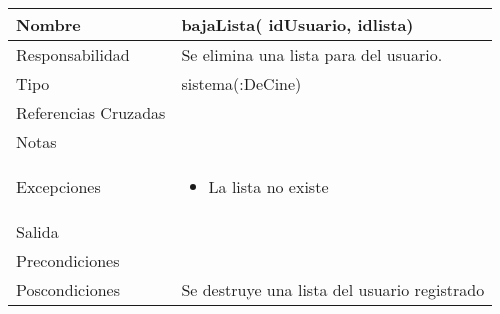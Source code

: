 \documentclass{article}
\begin{document}
\begin{table}[h]
\begin{tabular}{|l|l|l|l|l|l|}
\hline
\multicolumn{2}{|p{3cm}|}{Nombre} & \multicolumn{4}{p{10cm}|}{\textbf{bajaLista( idUsuario,  idlista)}}\\
\hline
\multicolumn{2}{|p{3cm}|}{Responsabilidad} & \multicolumn{4}{p{10cm}|}{Se elimina una lista para del usuario.} \\
\hline
\multicolumn{2}{|p{3cm}|}{Tipo} & \multicolumn{4}{p{10cm}|}{sistema(:DeCine)} \\
\hline
\multicolumn{2}{|p{3cm}|}{Referencias Cruzadas} & \multicolumn{4}{p{10cm}|}{} \\
\hline
\multicolumn{2}{|p{3cm}|}{Notas} & \multicolumn{4}{p{10cm}|}{} \\
\hline
\multicolumn{2}{|p{3cm}|}{Excepciones} & \multicolumn{4}{p{10cm}|}{\begin{itemize}
\item La lista no existe
\end{itemize}} \\
\hline
\multicolumn{2}{|p{3cm}|}{Salida} & \multicolumn{4}{p{10cm}|}{} \\
\hline
\multicolumn{2}{|p{3cm}|}{Precondiciones} & \multicolumn{4}{p{10cm}|}{} \\
\hline
\multicolumn{2}{|p{3cm}|}{Poscondiciones} & \multicolumn{4}{p{10cm}|}{Se destruye una lista del usuario registrado} \\
\hline
\end{tabular}
\end{table}
\end{document}
